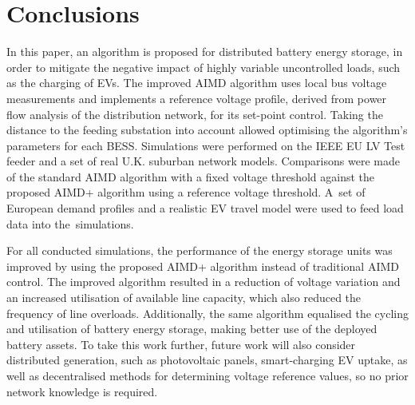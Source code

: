 \section{Conclusions}
\label{ch1:sec:conclusion}

In this paper, an algorithm is proposed for distributed battery energy storage, in order to mitigate the negative impact of highly variable uncontrolled loads, such as the charging of EVs. The improved AIMD algorithm uses local bus voltage measurements and implements a reference voltage profile, derived from power flow analysis of the distribution network, for its set-point control. Taking the distance to the feeding substation into account allowed optimising the algorithm's parameters for each BESS. Simulations were performed on the IEEE EU LV Test feeder and a set of real U.K. suburban network models. Comparisons were made of the standard AIMD algorithm with a fixed voltage threshold against the proposed AIMD+ algorithm using a reference voltage threshold. A~set of European demand profiles and a realistic EV travel model were used to feed load data into the~simulations.

For all conducted simulations, the performance of the energy storage units was improved by using the proposed AIMD+ algorithm instead of traditional AIMD control. The improved algorithm resulted in a reduction of voltage variation and an increased utilisation of available line capacity, which also reduced the frequency of line overloads. Additionally, the same algorithm equalised the cycling and utilisation of battery energy storage, making better use of the deployed battery assets. To take this work further, future work will also consider distributed generation, such as photovoltaic panels, smart-charging EV uptake, as well as decentralised methods for determining voltage reference values, so no prior network knowledge is required.